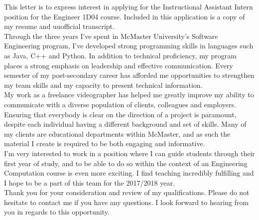 \documentclass[11pt, a4paper]{awesome-cv} %
\begin{document}
\makecvheader %

\makelettertitle %


\begin{cvletter}


This letter is to express interest in applying for the Instructional Assistant 
Intern position for the Engineer 1D04 course. Included in this application is a 
copy of my resume and unofficial transcript.\\

Through the three years I’ve spent in McMaster University’s Software 
Engineering program, I’ve developed strong programming skills in languages such 
as Java, C++ and Python. In addition to technical proficiency, my program 
places a strong emphasis on leadership and effective communication. Every 
semester of my post-secondary career has afforded me opportunities to 
strengthen my team skills and my capacity to present technical information.\\

My work as a freelance videographer has helped me greatly improve my ability to 
communicate with a diverse population of clients, colleagues and employers. 
Ensuring that everybody is clear on the direction of a project is paramount, 
despite each individual having a different background and set of skills. Many 
of my clients are educational departments within McMaster, and as such the 
material I create is required to be both engaging and informative.\\

I'm very interested to work in a position where I can guide students through 
their first year of study, and to be able to do so within the context of an 
Engineering Computation course is even more exciting. I find teaching 
incredibly fulfilling and I hope to be a part of this team for the 2017/2018 
year.\\

Thank you for your consideration and review of my qualifications. Please do not 
hesitate to contact me if you have any questions. I look forward to hearing 
from you in regards to this opportunity.


\end{cvletter}


\makeletterclosing %
\end{document}
